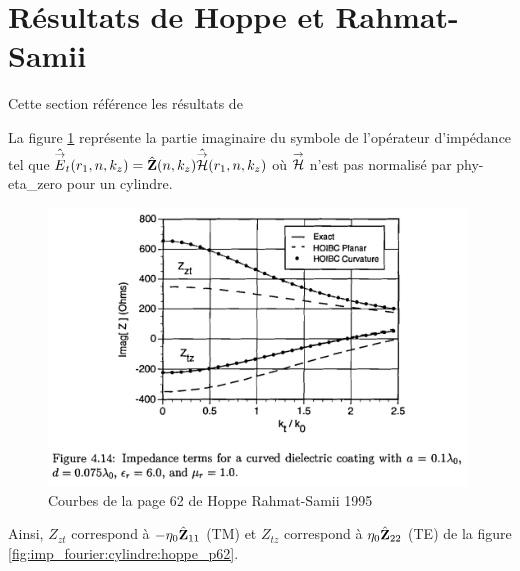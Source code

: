 \section{Résultats de Hoppe et Rahmat-Samii}

Cette section référence les résultats de \cite{hoppe_impedance_1995}


La figure \ref{fig:annex:hoppe:p62} représente la partie imaginaire du symbole de l'opérateur d'impédance tel que \( \hat{{\overset{\rightarrow}{E}}}_t(r_1,n,k_z) = \hat{\mathbf{Z}}(n,k_z) \hat{{\overset{\rightarrow}{\mathcal{H}}}}(r_1,n,k_z) \) où ${\overset{\rightarrow}{\mathcal{H}}}$ n'est pas normalisé par \gls{phy-eta_zero} pour un cylindre.

\begin{figure}[h!tb]
    \includegraphics[width=0.99\textwidth]{images/hoppe/p62_imp_cylindre.png}
    \caption{Courbes de la page 62 de Hoppe Rahmat-Samii 1995}
    \label{fig:annex:hoppe:p62}
\end{figure}

Ainsi, \(Z_{zt}\) correspond à \(-\eta_0\hat{\mathbf{Z}}_{11}\) (TM) et \(Z_{tz}\) correspond à \(\eta_0\hat{\mathbf{Z}}_{22}\) (TE) de la figure \ref{fig:imp_fourier:cylindre:hoppe_p62}.